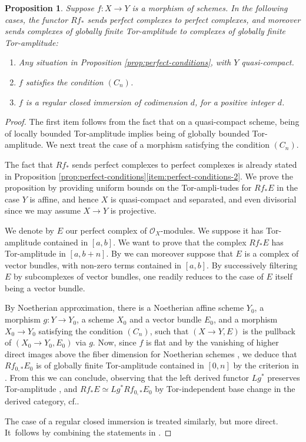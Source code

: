 \documentclass[11pt]{article}
\newcommand{\cf}{cf.\xspace}
\theoremstyle{plain}
\newtheorem{proposition}[theorem]{Proposition}
\theoremstyle{definition}
\newcommand{\Ocal}{\mathcal O}
\begin{document}
\begin{proposition}
Suppose $f: X\to Y$ is a morphism of schemes. In the following cases, the functor $Rf_\ast$ sends perfect complexes to perfect complexes, and moreover sends complexes of globally finite Tor-amplitude to complexes of globally finite Tor-amplitude:
\begin{enumerate}
\item Any situation in Proposition \ref{prop:perfect-conditions}, with $Y$ quasi-compact.
\item $f$ satisfies the condition $(C_n)$.
\item $f$ is a regular closed immersion of codimension $d$, for a positive integer $d$.
\end{enumerate}
\end{proposition}
\begin{proof}
The first item follows from the fact that on a quasi-compact scheme, being of locally bounded Tor-amplitude implies being of globally bounded Tor-amplitude. We next treat the case of a morphism satisfying the condition $(C_n)$.

The fact that $Rf_\ast$ sends perfect complexes to perfect complexes is already stated in Proposition \ref{prop:perfect-conditions}\eqref{item:perfect-conditions-2}. We prove the proposition by providing uniform bounds on the Tor-ampli\--tudes for $Rf_\ast E$ in the case $Y$ is affine, and hence $X$ is quasi-compact and separated, and even divisorial since we may assume $X\to Y$ is projective.

We denote by $E$ our perfect complex of $\Ocal_X$-modules. We suppose it has Tor-amplitude contained in $[a,b]$. We want to prove that the complex $Rf_{\ast}E$ has Tor-amplitude in $[a,b+n]$. By \cite[Th.\,2.4.3]{ThomasonTrobaugh} we can moreover suppose that $E$ is a complex of vector bundles, with non-zero terms contained in $[a,b]$. By successively filtering $E$ by subcomplexes of vector bundles, one readily reduces to the case of $E$ itself being a vector bundle.

By Noetherian approximation, there is a Noetherian affine scheme $Y_0$, a morphism $g: Y\to Y_0$, a scheme $X_0$ and a vector bundle $E_0$, and a morphism $X_0 \to Y_0$ satisfying the condition $(C_n)$, such that $(X\to Y, E)$ is the pullback of $(X_0 \to Y_0, E_0)$ via $g$. Now, since $f$ is flat and by the vanishing of higher direct images above the fiber dimension for Noetherian schemes \cite[\href{https://stacks.math.columbia.edu/tag/02V7}{02V7}]{stacks-project}, we deduce that $Rf_{0, \ast} E_0$ is of globally finite Tor-amplitude contained in $[0,n]$ by the criterion in \cite[III, Cor.\,3.7.1]{SGA6}. From this we can conclude, observing that the left derived functor $Lg^\ast$ preserves Tor-amplitude \hbox{\cite[III, Cor.\,3.5.2]{SGA6}}, and $Rf_\ast E \simeq Lg^\ast Rf_{0, \ast} E_0$ by Tor-independent base change in the derived category, \cf \cite[\href{https://stacks.math.columbia.edu/tag/08IB}{08IB}]{stacks-project}.

The case of a regular closed immersion is treated similarly, but more direct. It~follows by combining the statements in \cite[Ex.\,4.1.1, Prop.\,4.4, Cor.\,4.5.1]{SGA6}.
\end{proof}
\end{document}
